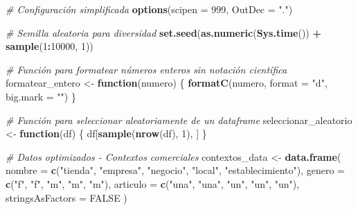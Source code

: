 \documentclass[
]{article}
\author{}
\date{\vspace{-2.5em}}
\newenvironment{Shaded}{\begin{snugshade}}{\end{snugshade}}
\newcommand{\AttributeTok}[1]{\textcolor[rgb]{0.13,0.29,0.53}{#1}}
\newcommand{\CommentTok}[1]{\textcolor[rgb]{0.56,0.35,0.01}{\textit{#1}}}
\newcommand{\ConstantTok}[1]{\textcolor[rgb]{0.56,0.35,0.01}{#1}}
\newcommand{\ControlFlowTok}[1]{\textcolor[rgb]{0.13,0.29,0.53}{\textbf{#1}}}
\newcommand{\DecValTok}[1]{\textcolor[rgb]{0.00,0.00,0.81}{#1}}
\newcommand{\FunctionTok}[1]{\textcolor[rgb]{0.13,0.29,0.53}{\textbf{#1}}}
\newcommand{\NormalTok}[1]{#1}
\newcommand{\OtherTok}[1]{\textcolor[rgb]{0.56,0.35,0.01}{#1}}
\newcommand{\SpecialCharTok}[1]{\textcolor[rgb]{0.81,0.36,0.00}{\textbf{#1}}}
\newcommand{\StringTok}[1]{\textcolor[rgb]{0.31,0.60,0.02}{#1}}
\begin{document}
\begin{Shaded}
\begin{Highlighting}[]
\CommentTok{\# Configuración simplificada}
\FunctionTok{options}\NormalTok{(}\AttributeTok{scipen =} \DecValTok{999}\NormalTok{, }\AttributeTok{OutDec =} \StringTok{"."}\NormalTok{)}

\CommentTok{\# Semilla aleatoria para diversidad}
\FunctionTok{set.seed}\NormalTok{(}\FunctionTok{as.numeric}\NormalTok{(}\FunctionTok{Sys.time}\NormalTok{()) }\SpecialCharTok{+} \FunctionTok{sample}\NormalTok{(}\DecValTok{1}\SpecialCharTok{:}\DecValTok{10000}\NormalTok{, }\DecValTok{1}\NormalTok{))}

\CommentTok{\# Función para formatear números enteros sin notación científica}
\NormalTok{formatear\_entero }\OtherTok{\textless{}{-}} \ControlFlowTok{function}\NormalTok{(numero) \{}
  \FunctionTok{formatC}\NormalTok{(numero, }\AttributeTok{format =} \StringTok{"d"}\NormalTok{, }\AttributeTok{big.mark =} \StringTok{""}\NormalTok{)}
\NormalTok{\}}

\CommentTok{\# Función para seleccionar aleatoriamente de un dataframe}
\NormalTok{seleccionar\_aleatorio }\OtherTok{\textless{}{-}} \ControlFlowTok{function}\NormalTok{(df) \{}
\NormalTok{  df[}\FunctionTok{sample}\NormalTok{(}\FunctionTok{nrow}\NormalTok{(df), }\DecValTok{1}\NormalTok{), ]}
\NormalTok{\}}

\CommentTok{\# Datos optimizados {-} Contextos comerciales}
\NormalTok{contextos\_data }\OtherTok{\textless{}{-}} \FunctionTok{data.frame}\NormalTok{(}
  \AttributeTok{nombre =} \FunctionTok{c}\NormalTok{(}\StringTok{"tienda"}\NormalTok{, }\StringTok{"empresa"}\NormalTok{, }\StringTok{"negocio"}\NormalTok{, }\StringTok{"local"}\NormalTok{, }\StringTok{"establecimiento"}\NormalTok{),}
  \AttributeTok{genero =} \FunctionTok{c}\NormalTok{(}\StringTok{"f"}\NormalTok{, }\StringTok{"f"}\NormalTok{, }\StringTok{"m"}\NormalTok{, }\StringTok{"m"}\NormalTok{, }\StringTok{"m"}\NormalTok{),}
  \AttributeTok{articulo =} \FunctionTok{c}\NormalTok{(}\StringTok{"una"}\NormalTok{, }\StringTok{"una"}\NormalTok{, }\StringTok{"un"}\NormalTok{, }\StringTok{"un"}\NormalTok{, }\StringTok{"un"}\NormalTok{),}
  \AttributeTok{stringsAsFactors =} \ConstantTok{FALSE}
\NormalTok{)}


\end{Highlighting}
\end{Shaded}
\end{document}
